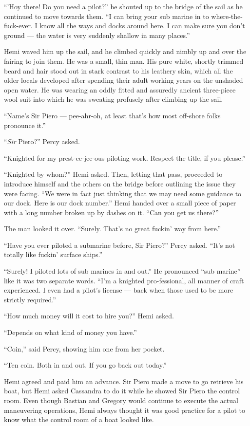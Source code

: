 \documentclass[
]{scrbook}
\begin{document}
``'Hoy there! Do you need a pilot?'' he shouted up to the bridge of the
sail as he continued to move towards them. ``I can bring your sub marine
in to where-the-fuck-ever. I know all the ways and docks around here. I
can make sure you don't ground --- the water is very suddenly shallow in
many places.''

Hemi waved him up the sail, and he climbed quickly and nimbly up and
over the fairing to join them. He was a small, thin man. His pure white,
shortly trimmed beard and hair stood out in stark contrast to his
leathery skin, which all the older locals developed after spending their
adult working years on the unshaded open water. He was wearing an oddly
fitted and assuredly ancient three-piece wool suit into which he was
sweating profusely after climbing up the sail.

``Name's Sir Piero --- pee-ahr-oh, at least that's how most off-shore
folks pronounce it.''

``\emph{Sir} Piero?'' Percy asked.

``Knighted for my prest-ee-jee-ous piloting work. Respect the title, if
you please.''

``Knighted by whom?'' Hemi asked. Then, letting that pass, proceeded to
introduce himself and the others on the bridge before outlining the
issue they were facing. ``We were in fact just thinking that we may need
some guidance to our dock. Here is our dock number.'' Hemi handed over a
small piece of paper with a long number broken up by dashes on it. ``Can
you get us there?''

The man looked it over. ``Surely. That's no great fuckin' way from
here.''

``Have you ever piloted a submarine before, Sir Piero?'' Percy asked.
``It's not totally like fuckin' surface ships.''

``Surely! I piloted lots of sub marines in and out.'' He pronounced
``sub marine'' like it was two separate words. ``I'm a knighted
pro-fessional, all manner of craft experienced. I even had a pilot's
license --- back when those used to be more strictly required.''

``How much money will it cost to hire you?'' Hemi asked.

``Depends on what kind of money you have.''

``Coin,'' said Percy, showing him one from her pocket.

``Ten coin. Both in and out. If you go back out today.''

Hemi agreed and paid him an advance. Sir Piero made a move to go
retrieve his boat, but Hemi asked Cassandra to do it while he showed Sir
Piero the control room. Even though Bastian and Gregory would continue
to execute the actual maneuvering operations, Hemi always thought it was
good practice for a pilot to know what the control room of a boat looked
like.
\end{document}
